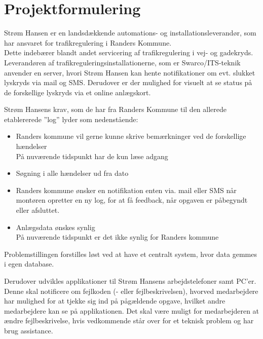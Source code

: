 
	\chapter{Projektformulering}
	
	Strøm Hansen er en landsdækkende automations- og installationsleverandør, som har ansvaret for trafikregulering i Randers Kommune. \\Dette indebærer blandt andet servicering af trafikregulering i vej- og gadekryds.
	Leverandøren af trafikreguleringsinstallationerne, som er Swarco/ITS-teknik anvender en server, hvori Strøm Hansen kan hente notifikationer om evt. slukket lyskryds via mail og SMS. Derudover er der mulighed for visuelt at se status på de forskellige lyskryds via et online anlægskort.
	
	Strøm Hansens krav, som de har fra Randers Kommune til den allerede etablererede ”log” lyder som nedenstående:
	
	\begin{itemize}[-]
		\item Randers kommune vil gerne kunne skrive bemærkninger ved de forskellige hændelser\\
		På nuværende tidspunkt har de kun læse adgang\\
		
		\item Søgning i alle hændelser ud fra dato\\
		
		\item Randers kommune ønsker en notifikation enten via. mail eller SMS når montøren opretter en ny log, for at få feedback, når opgaven er påbegyndt eller afsluttet.\\
		
		\item Anlægsdata ønskes synlig \\
		På nuværende tidspunkt er det ikke synlig for Randers kommune
	\end{itemize}
		
	Problemstillingen forstilles løst ved at have et centralt system, hvor data gemmes i egen database.
	
	Derudover udvikles applikationer til Strøm Hansens arbejdstelefoner samt PC'er.
	Denne skal notificere om fejlkoden (- eller fejlbeskrivelsen), hvorved medarbejdere har mulighed for at tjekke sig ind på pågældende opgave, hvilket andre medarbejdere kan se på applikationen. Det skal være muligt for medarbejderen at ændre fejlbeskrivelse, hvis vedkommende står over for et teknisk problem og har brug assistance. \\
	


